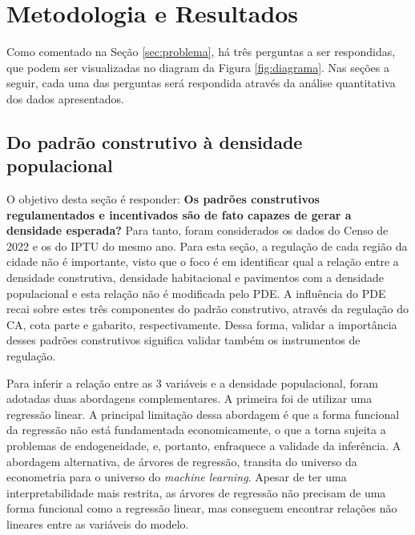 \chapter{Metodologia e Resultados}
\label{chp:analise}

Como comentado na Seção \ref{sec:problema}, há três perguntas a ser respondidas, que podem ser visualizadas no diagram da Figura \ref{fig:diagrama}. Nas seções a seguir, cada uma das perguntas será respondida através da análise quantitativa dos dados apresentados.


\section{Do padrão construtivo à densidade populacional}
\label{sec:perg1}


O objetivo desta seção é responder: \textbf{Os padrões construtivos regulamentados e incentivados são de fato capazes de gerar a densidade esperada?} Para tanto, foram considerados os dados do Censo de 2022 e os do IPTU do mesmo ano. Para esta seção, a regulação de cada região da cidade não é importante, visto que o foco é em identificar qual a relação entre a densidade construtiva, densidade habitacional e pavimentos com a densidade populacional e esta relação não é modificada pelo PDE. A influência do PDE recai sobre estes três componentes do padrão construtivo, através da regulação do CA, cota parte e gabarito, respectivamente. Dessa forma, validar a importância desses padrões construtivos significa validar também os instrumentos de regulação.

Para inferir a relação entre as 3 variáveis e a densidade populacional, foram adotadas duas abordagens complementares. A primeira foi de utilizar uma regressão linear. A principal limitação dessa abordagem é que a forma funcional da regressão não está fundamentada economicamente, o que a torna sujeita a problemas de endogeneidade, e, portanto, enfraquece a validade da inferência. A abordagem alternativa, de árvores de regressão, transita do universo da econometria para o universo do \textit{machine learning}. Apesar de ter uma interpretabilidade mais restrita, as árvores de regressão não precisam de uma forma funcional como a regressão linear, mas conseguem encontrar relações não lineares entre as variáveis do modelo.


